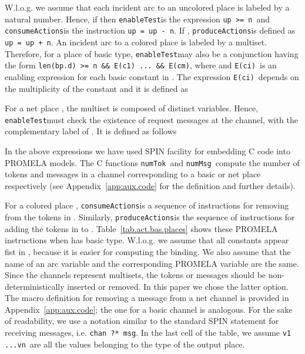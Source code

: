 \documentclass{llncs}
\begin{document}
W.l.o.g. we assume that each incident arc to an uncolored place  is labeled by a natural number. Hence, if  then \small\verb"enableTest"\nfont is the expression \small\verb"up >= n"\nfont\ and \small\verb"consumeActions"\nfont is the instruction \small\verb"up = up - n"\nfont. If , \small\verb"produceActions"\nfont is defined as \small\verb"up = up + n"\nfont. An incident arc to a colored place is labeled by a multiset. Therefore, for a place  of basic type, \small\verb"enableTest"\nfont may also be a conjunction having the form \small\verb"len(bp.d) >= n && E(c1) ... && E(cm)"\nfont, where   and  \small\verb"E(ci)"\nfont\  is an enabling expression for each basic constant in . The expression \small\verb"E(ci)"\nfont\  depends on the multiplicity  of the constant  and it is defined as



\noindent For a net place , the multiset  is composed of distinct variables. Hence,  \small\verb"enableTest"\nfont must check the existence of  request messages at the channel, with the complementary label of . It is defined as follows




\noindent In the above expressions we have used SPIN facility for embedding C code into PROMELA models. The C functions  \small\verb"numTok"\nfont\ and \small\verb"numMsg"\nfont\  compute the number of tokens and messages in a channel corresponding to a basic or net place respectively (see  Appendix~\ref{app:aux.code} for the definition and further details).

For a colored place , \small\verb"consumeActions"\nfont is a sequence of instructions for removing from  the tokens in . Similarly, \small\verb"produceActions"\nfont is the sequence of instructions for adding the tokens in  to . Table~\ref{tab.act.bas.places} shows these PROMELA instructions when  has basic type.
W.l.o.g. we assume that all constants appear fist in , because it is easier for computing the binding. We also assume that the name of an arc variable and the corresponding PROMELA variable are the same. Since the channels represent multisets, the tokens or messages should be non-deterministically inserted or removed. In this paper we chose the latter option. The macro definition for removing a message from a net channel is provided in Appendix~\ref{app:aux.code}; the one for a basic channel is analogous. For the sake of readability, we use a notation similar to the standard SPIN statement for receiving messages, i.e. \small\verb"chan ?* msg"\nfont. In the last cell of the table, we assume \small\verb"v1 ...vn"\nfont\ are all the values belonging to the type of the output place.
\end{document}
